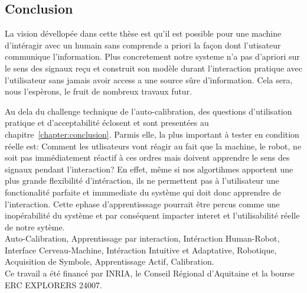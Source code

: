 \subsection*{Conclusion}

La vision dévellopée dans cette thèse est qu'il est possible pour une machine d'intéragir avec un humain sans comprende a priori la façon dont l'utisateur communique l'information. Plus concretement notre systeme n'a pas d'apriori sur le sens des signaux reçu et construit son modèle durant l'interaction pratique avec l'utilisateur sans jamais avoir access a une source sûre d'information. Cela sera, nous l'espèrons, le fruit de nombreux travaux futur.

Au dela du challenge technique de l'auto-calibration, des questions d'utilisation pratique et d'acceptabilité éclosent et sont presentées au chapitre~\ref{chapter:conclusion}. Parmis elle, la plus important à tester en condition réelle est: Comment les utlisateurs vont réagir au fait que la machine, le robot, ne soit pas immédiatement réactif à ces ordres mais doivent apprendre le sens des signaux pendant l'interaction? En effet, même si nos algortihmes apportent une plus grande flexibilité d'intéraction, ils ne permettent pas à l'utilisateur une fonctionalité parfaite et immmediate du système qui doit donc apprendre de l'interaction. Cette ephase d'apprentisssage pourrait être percus comme une inopérabilité du système et par conséquent impacter interet et l'utilisabilité réelle de notre sytème.\\

 Auto-Calibration, Apprentissage par interaction, Intéraction Human-Robot, Interface Cerveau-Machine, Intéraction Intuitive et Adaptative, Robotique, Acquisition de Symbole, Apprentissage Actif, Calibration.\\

Ce travail a été financé par INRIA, le Conseil R\'egional d'Aquitaine et la bourse ERC EXPLORERS 24007.

